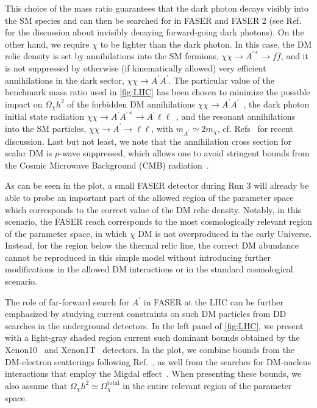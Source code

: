 \documentclass[prd,twocolumn,reprint,preprintnumbers,nofootinbib]{revtex4-1}
\begin{document}
This choice of the mass ratio guarantees that the dark photon decays visibly into the SM species and can then be searched for in FASER and FASER 2 (see Ref.~\cite{Batell:2021blf} for the discussion about invisibly decaying forward-going dark photons). On the other hand, we require $\chi$ to be lighter than the dark photon. In this case, the DM relic density is set by annihilations into the SM fermions, $\chi\chi\to A^{\prime\ast}\to f\bar{f}$, and it is not suppressed by otherwise (if kinematically allowed) very efficient annihilations in the dark sector, $\chi\chi\to A^{\prime}A^{\prime}$. The particular value of the benchmark mass ratio used in \cref{fig:LHC} has been chosen to minimize the possible impact on $\Omega_\chi h^2$ of the forbidden DM annihilations  $\chi\chi\to A^\prime A^\prime$~\cite{DAgnolo:2015ujb}, the dark photon initial state radiation $\chi\chi\to A^\prime A^{\prime\ast}\to A^\prime \ell\ell$~\cite{Rizzo:2020jsm}, and the resonant annihilations into the SM particles, $\chi\chi\to A^\prime \to \ell\ell$, with $m_{A^\prime}\simeq 2 m_\chi$, cf. Refs~\cite{Feng:2017drg,Berlin:2020uwy,Bernreuther:2020koj} for recent discussion. Last but not least, we note that the annihilation cross section for scalar DM is $p$-wave suppressed, which allows one to avoid stringent bounds from the Cosmic Microwave Background (CMB) radiation~\cite{Slatyer:2009yq,Aghanim:2018eyx}.

As can be seen in the plot, a small FASER detector during Run 3 will already be able to probe an important part of the allowed region of the parameter space which corresponds to the correct value of the DM relic density. Notably, in this scenario, the FASER reach corresponds to the most cosmologically relevant region of the parameter space, in which $\chi$ DM is not overproduced in the early Universe. Instead, for the region below the thermal relic line, the correct DM abundance cannot be reproduced in this simple model without introducing further modifications in the allowed DM interactions or in the standard cosmological scenario. 

The role of far-forward search for $A^\prime$ in FASER at the LHC can be further emphasized by studying current constraints on such DM particles from DD searches in the underground detectors. In the left panel of \cref{fig:LHC}, we present with a light-gray shaded region current such dominant bounds obtained by the Xenon10~\cite{Angle:2011th} and Xenon1T~\cite{Aprile:2019xxb,Aprile:2019jmx} detectors. In the plot, we combine bounds from the DM-electron scatterings following Ref.~\cite{Essig:2017kqs}, as well from the searches for DM-nucleus interactions that employ the Migdal effect~\cite{Ibe:2017yqa}. When presenting these bounds, we also assume that $\Omega_\chi h^2 \simeq \Omega_\chi^{\textrm{total}}$ in the entire relevant region of the parameter space. 
\end{document}
